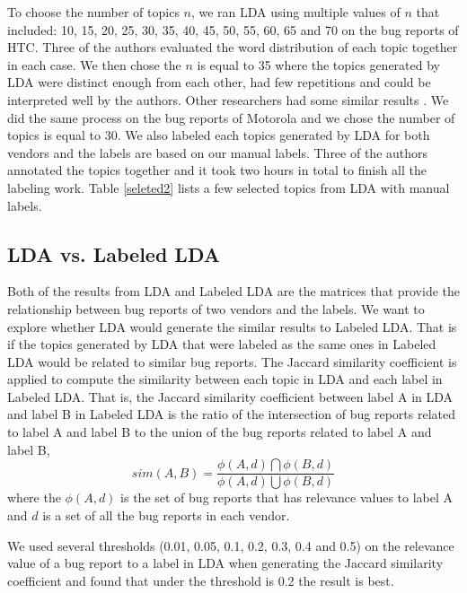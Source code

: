 \documentclass[10pt, conference, compsocconf]{IEEEtran}
\begin{document}
To choose the number of topics $n$, we ran LDA using multiple values of $n$ that included: 10, 15, 20, 25, 30, 35, 40, 45, 50, 55, 60, 65 and 70 on the bug reports of HTC. Three of the authors evaluated the word distribution of each topic together in each case. We then chose the $n$ is equal to 35 where the topics generated by LDA were distinct enough from each other, had few repetitions and could be interpreted well by the authors. Other researchers had some similar results \cite{Thomas:2011} \cite{Hindle}. We did the same process on the bug reports of Motorola and we chose the number of topics is equal to 30. We also labeled each topics generated by LDA for both vendors and the labels are based on our manual labels. Three of the authors annotated the topics together and it took two hours in total to finish all the labeling work. Table \ref{seleted2} lists a few selected topics from LDA with manual labels.


\subsection{LDA vs. Labeled LDA}
Both of the results from LDA and Labeled LDA are the matrices that provide the relationship between bug reports of two vendors and the labels. We want to explore whether LDA would generate the similar results to Labeled LDA. That is if the topics generated by LDA that were labeled as the same ones in Labeled LDA would be related to similar bug reports.
The Jaccard similarity coefficient is applied to compute the similarity between each topic in LDA and each label in Labeled LDA. That is, the Jaccard similarity coefficient between label A in LDA and label B in Labeled LDA is the ratio of the intersection of bug reports related to label A and label B to the union of the bug reports related to label A and label B,
\begin{equation}
sim(A,B) = \frac{\phi(A,d)\bigcap\phi(B,d)}{\phi(A,d)\bigcup\phi(B,d)}
\end{equation}
where the $\phi(A,d)$ is the set of bug reports that has relevance values to label A and $d$ is a set of all the bug reports in each vendor.

We used several thresholds (0.01, 0.05, 0.1, 0.2, 0.3, 0.4 and 0.5) on the relevance value of a bug report to a label in LDA when generating the Jaccard similarity coefficient and found that under the threshold is 0.2 the result is best.
\end{document}
